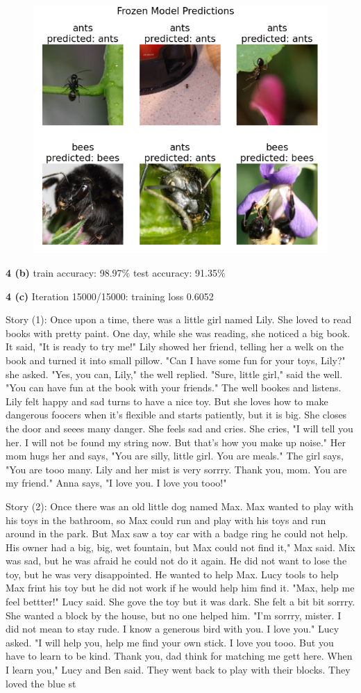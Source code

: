 \documentclass[12 pt]{article}        	%
\begin{document}
\begin{figure}[h!]
  \includegraphics[width=0.6\linewidth]{tl_frozen.png}
\end{figure}

\clearpage

\textbf{4 (b)} train accuracy: 98.97\% test accuracy: 91.35\%

\textbf{4 (c)}
Iteration 15000/15000: training loss 0.6052

Story (1): 
Once upon a time, there was a little girl named Lily. She loved to read books with pretty paint. One day, while she was reading, she noticed a big book. It said, "It is ready to try me!" Lily showed her friend, telling her a welk on the book and turned it into small pillow.
"Can I have some fun for your toys, Lily?" she asked.
"Yes, you can, Lily," the well replied.
"Sure, little girl," said the well. "You can have fun at the book with your friends."
The well bookes and listens. Lily felt happy and sad turns to have a nice toy. But she loves how to make dangerous foocers when it's flexible and starts patiently, but it is big. She closes the door and seees many danger. She feels sad and cries. She cries, "I will tell you her. I will not be found my string now. But that's how you make up noise." Her mom hugs her and says, "You are silly, little girl. You are meals." The girl says, "You are tooo many. Lily and her mist is very sorrry. Thank you, mom. You are my friend." Anna says, "I love you. I love you tooo!"

Story (2): 
Once there was an old little dog named Max. Max wanted to play with his toys in the bathroom, so Max could run and play with his toys and run around in the park. But Max saw a toy car with a badge ring he could not help. His owner had a big, big, wet fountain, but Max could not find it," Max said.
Mix was sad, but he was afraid he could not do it again. He did not want to lose the toy, but he was very disappointed. He wanted to help Max. Lucy tools to help Max frint his toy but he did not work if he would help him find it.
"Max, help me feel bettter!" Lucy said. She gove the toy but it was dark. She felt a bit bit sorrry. She wanted a block by the house, but no one helped him.
"I'm sorrry, mister. I did not mean to stay rude. I know a generous bird with you. I love you." Lucy asked.
"I will help you, help me find your own stick. I love you tooo. But you have to learn to be kind. Thank you, dad think for matching me gett here. When I learn you," Lucy and Ben said.
They went back to play with their blocks. They loved the blue st
\end{document}
